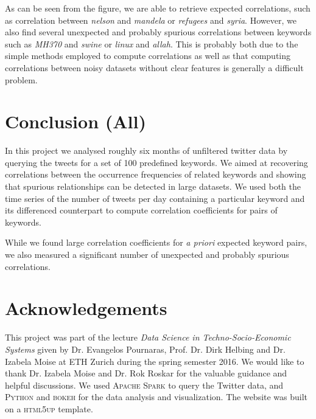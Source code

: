 \documentclass[12pt, a4paper]{article}
\begin{document}
As can be seen from the figure, we are able to retrieve expected correlations, such as correlation between \textit{nelson} and \textit{mandela} or \textit{refugees} and \textit{syria}. However, we also find several unexpected and probably spurious correlations between keywords such as \textit{MH370} and \textit{swine} or \textit{linux} and \textit{allah}. 
This is probably both due to the simple methods employed to compute correlations as well as that computing correlations between noisy datasets without clear features is generally a difficult problem.


\section{Conclusion (All)}
In this project we analysed roughly six months of unfiltered twitter data by querying the tweets for a set of 100 predefined keywords. We aimed at recovering correlations between the occurrence frequencies of related keywords and showing that spurious relationships can be detected in large datasets. We used both the time series of the number of tweets per day containing a particular keyword and its differenced counterpart to compute correlation coefficients for pairs of keywords. 

While we found large correlation coefficients for \textit{a priori} expected keyword pairs, we also measured a significant number of unexpected and probably spurious correlations.


\section{Acknowledgements}
This project was part of the lecture \textit{Data Science in Techno-Socio-Economic Systems} given by Dr. Evangelos Pournaras, Prof. Dr. Dirk Helbing and Dr. Izabela Moise at ETH Zurich during the spring semester 2016. We would like to thank Dr. Izabela Moise and Dr. Rok Roskar for the valuable guidance and helpful discussions. We used \textsc{Apache Spark} \cite{spark}  to query the Twitter data, and \textsc{Python} \cite{python} and \textsc{bokeh} \cite{bokeh} for the data analysis and visualization. The website was built on a \textsc{html5up} \cite{html5up} template.
\end{document}
